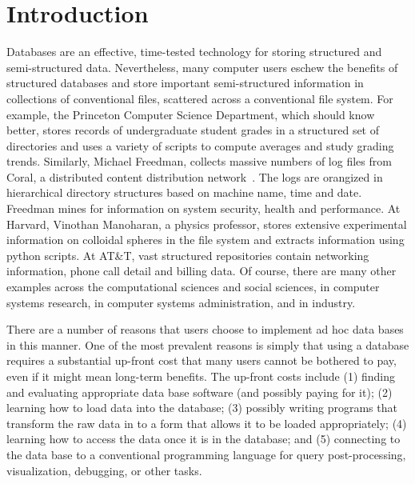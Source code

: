 \section {Introduction}
\label{sec:intro}

%
Databases are an effective, time-tested technology for storing
structured and semi-structured data.  Nevertheless, many computer
users eschew the benefits of structured databases and store important
semi-structured information in collections of conventional files,
scattered across a conventional file system.  For example, the
Princeton Computer Science Department, which should know better,
stores records of undergraduate student grades in a structured set of
directories and uses a variety of scripts to compute averages and
study grading trends.  Similarly, Michael Freedman, collects massive
numbers of log files from Coral, a distributed content distribution
network~\cite{coral}.  The logs are orangized in hierarchical
directory structures based on machine name, time and date.  Freedman
mines for information on system security, health and performance.  At
Harvard, Vinothan Manoharan, a physics professor, stores extensive
experimental information on colloidal spheres in the file system and
extracts information using python scripts.  At AT\&T, vast structured
repositories contain networking information,
phone call detail and billing data.  Of course, there are
many other examples across the computational sciences and social
sciences, in computer systems research, in computer
systems administration, and in industry.

There are a number of reasons that users
choose to implement ad hoc data bases in this manner.  One of the most 
prevalent
reasons is simply that using a database requires a substantial up-front cost that
many users cannot be bothered to pay, even if it might mean long-term
benefits.  The up-front costs include (1) finding and evaluating
appropriate data base
software (and possibly paying for it); (2) learning how to load data into
the database; (3) possibly writing programs that transform the raw
data in to a form that allows it to be loaded appropriately; 
(4) learning how to access the data once it is in the database; and 
(5) connecting to the data base to a conventional programming language
for query post-processing, visualization, debugging, or other tasks.

